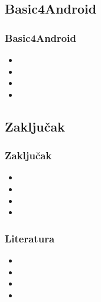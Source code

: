 \documentclass{beamer}
\begin{document}
\begin{frame}
    \section{Basic4Android}
    \frametitle{Basic4Android} 
    \begin{itemize}
	\item
	\item 
	\item 
	\item  
   \end{itemize}
\end{frame}

\begin{frame}
    \section{Zaključak}
    \frametitle{Zaključak} 
    \begin{itemize}
	\item
	\item 
	\item 
	\item  
   \end{itemize}
\end{frame}

\begin{frame}
    \frametitle{Literatura}
    \begin{itemize}
	\item
	\item 
	\item 
	\item  
   \end{itemize}
\end{frame}
\end{document}
